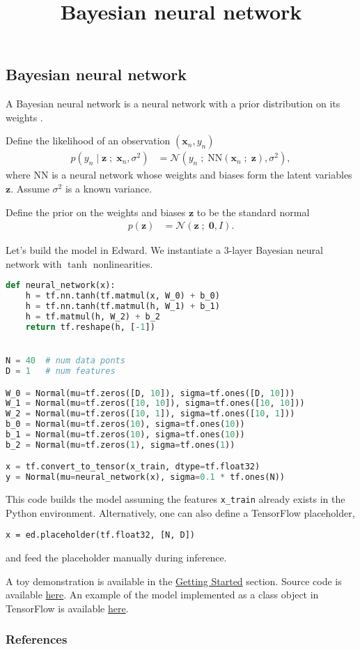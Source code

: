 \title{Bayesian neural network}

\subsection{Bayesian neural network}

A Bayesian neural network is a neural network with a prior
distribution on its weights \citep{neal2012bayesian}.

Define the likelihood of an observation $(\mathbf{x}_n, y_n)$
\begin{align*}
  p(y_n \mid \mathbf{z} \;;\; \mathbf{x}_n, \sigma^2)
  &=
  \mathcal{N}(y_n \;;\; \mathrm{NN}(\mathbf{x}_n\;;\;\mathbf{z}), \sigma^2),
\end{align*}
where $\mathrm{NN}$ is a neural network whose weights and biases form
the latent variables $\mathbf{z}$. Assume $\sigma^2$ is a
known variance.

Define the prior on the weights and biases $\mathbf{z}$ to be the standard normal
\begin{align*}
  p(\mathbf{z})
  &=
  \mathcal{N}(\mathbf{z} \;;\; \mathbf{0}, I).
\end{align*}

Let's build the model in Edward. We
instantiate a 3-layer Bayesian neural network with $\tanh$
nonlinearities.
\begin{lstlisting}[language=Python]
def neural_network(x):
    h = tf.nn.tanh(tf.matmul(x, W_0) + b_0)
    h = tf.nn.tanh(tf.matmul(h, W_1) + b_1)
    h = tf.matmul(h, W_2) + b_2
    return tf.reshape(h, [-1])


N = 40  # num data ponts
D = 1   # num features

W_0 = Normal(mu=tf.zeros([D, 10]), sigma=tf.ones([D, 10]))
W_1 = Normal(mu=tf.zeros([10, 10]), sigma=tf.ones([10, 10]))
W_2 = Normal(mu=tf.zeros([10, 1]), sigma=tf.ones([10, 1]))
b_0 = Normal(mu=tf.zeros(10), sigma=tf.ones(10))
b_1 = Normal(mu=tf.zeros(10), sigma=tf.ones(10))
b_2 = Normal(mu=tf.zeros(1), sigma=tf.ones(1))

x = tf.convert_to_tensor(x_train, dtype=tf.float32)
y = Normal(mu=neural_network(x), sigma=0.1 * tf.ones(N))
\end{lstlisting}
This code builds the model assuming the features \texttt{x\_train}
already exists in the Python environment. Alternatively, one can also
define a TensorFlow placeholder,
\begin{lstlisting}
x = ed.placeholder(tf.float32, [N, D])
\end{lstlisting}
and feed the placeholder manually during inference.

A toy demonstration is available in the \href{getting-started}{Getting Started} section.
Source code is available
\href{https://github.com/blei-lab/edward/blob/master/examples/bayesian_nn.py}
{here}.
An example of the model implemented as a class object in TensorFlow is
available
\href{https://github.com/blei-lab/edward/blob/master/examples/tf_bayesian_nn.py}
{here}.

\subsubsection{References}\label{references}
